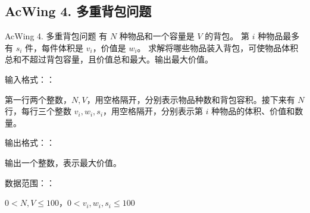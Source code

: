 \subsection{AcWing 4. 多重背包问题}
\begin{titledbox}{AcWing 4. 多重背包问题}
    有 $N$ 种物品和一个容量是 $V$ 的背包。 第 $i$ 种物品最多有 $s_i$ 件，每件体积是 $v_i$，价值是 $w_i$。 求解将哪些物品装入背包，可使物品体积总和不超过背包容量，且价值总和最大。输出最大价值。

    输入格式：：

    第一行两个整数，$N, V$，用空格隔开，分别表示物品种数和背包容积。接下来有 $N$ 行，每行三个整数 $v_i, w_i, s_i$，用空格隔开，分别表示第 $i$ 种物品的体积、价值和数量。

    输出格式：：

    输出一个整数，表示最大价值。

    数据范围：：

    $0  < N, V \le 100$，$0  < v_i, w_i, s_i \le 100$

    \begin{inputblock}
         \\
         \\
         \\
         \\
    \end{inputblock}
    \begin{outputblock}
    \end{outputblock}
\end{titledbox}

